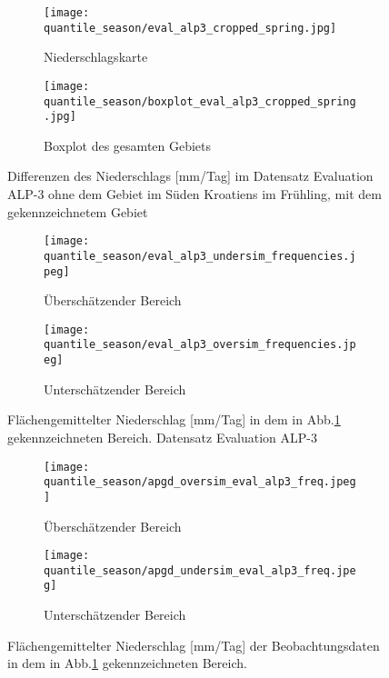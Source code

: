 \begin{figure}[h!]
	\begin{subfigure}{0.49\textwidth}
		\texttt{[image: quantile\_season/eval\_alp3\_cropped\_spring.jpg]}
		\caption{Niederschlagskarte}
		\label{fig:seasons:cropped eval_alp_3}
	\end{subfigure}
	\begin{subfigure}{0.49\textwidth}
		\texttt{[image: quantile\_season/boxplot\_eval\_alp3\_cropped\_spring.jpg]}
		\caption{Boxplot des gesamten Gebiets}
		\label{fig:seasons:cropped eval_alp_3_boxplot}
	\end{subfigure}
	\caption{Differenzen des Niederschlags [mm/Tag] im Datensatz Evaluation ALP-3 ohne dem Gebiet im Süden Kroatiens im Frühling, mit dem gekennzeichnetem Gebiet}
\end{figure}

\begin{figure}[h!]
	\begin{subfigure}{0.49\textwidth}
		\texttt{[image: quantile\_season/eval\_alp3\_undersim\_frequencies.jpeg]}
		\caption{Überschätzender Bereich}
		\label{fig:seasons:oversim eval_alp_3}
	\end{subfigure}
	\begin{subfigure}{0.49\textwidth}
		\texttt{[image: quantile\_season/eval\_alp3\_oversim\_frequencies.jpeg]}
		\caption{Unterschätzender Bereich}
		\label{fig:seasons:undersim_eval_alp_3}
	\end{subfigure}
	\caption{Flächengemittelter Niederschlag [mm/Tag] in dem in Abb.\ref{fig:seasons:cropped eval_alp_3} gekennzeichneten Bereich. Datensatz Evaluation ALP-3}
	\label{fig:seasons:overunder_eval_alp3}
\end{figure}
\begin{figure}[h!]
	\begin{subfigure}{0.49\textwidth}
		\texttt{[image: quantile\_season/apgd\_oversim\_eval\_alp3\_freq.jpeg]}
		\caption{Überschätzender Bereich}
		\label{fig:seasons:oversim eval_alp_3_obs}
	\end{subfigure}
	\begin{subfigure}{0.49\textwidth}
		\texttt{[image: quantile\_season/apgd\_undersim\_eval\_alp3\_freq.jpeg]}
		\caption{Unterschätzender Bereich}
		\label{fig:seasons:undersim_eval_alp_3_obs}
	\end{subfigure}
	\caption{Flächengemittelter Niederschlag [mm/Tag] der Beobachtungsdaten in dem in Abb.\ref{fig:seasons:cropped eval_alp_3} gekennzeichneten Bereich.}
	\label{fig:seasons:overunder_obs_eval_alp3}
\end{figure}

